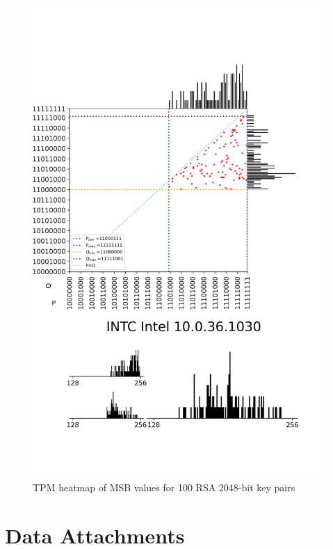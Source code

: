 \begin{figure}[H]
    \centering
    \includegraphics[width=\textwidth,height=\textheight-1.5cm, keepaspectratio]{img/visualizations/rsa1.png}
    \caption{TPM heatmap of MSB values for 100 RSA 2048-bit key pairs}
    \label{fig:heatmap-rsa-100-2048}
\end{figure}




\renewcommand{\thechapter}{C}
\chapter{Data Attachments}
